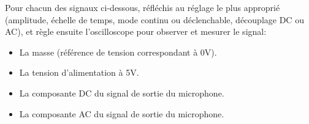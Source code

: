 Pour chacun des signaux ci-dessous, réfléchis au réglage le plus approprié (amplitude, échelle de temps, mode continu ou déclenchable, découplage DC ou AC), et règle ensuite l'oscilloscope pour observer et mesurer le signal:
\begin{itemize}
\item La masse (référence de tension correspondant à 0V).
\item La tension d'alimentation à 5V.
\item La composante DC du signal de sortie du microphone.
\item La composante AC du signal de sortie du microphone.
\end{itemize}